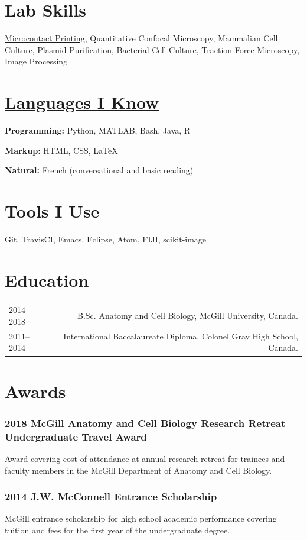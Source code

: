 \documentclass[%
	12pt,%
	]
	{article}
\begin{document}
\section*{Lab Skills}

\href{https://jidicula.github.io/images/micropattern.jpg}{Microcontact Printing}, Quantitative Confocal Microscopy, Mammalian Cell Culture, Plasmid Purification, Bacterial Cell Culture, Traction Force Microscopy, Image Processing


\section*{\href{https://github.com/jidicula}{Languages I Know}}

\textbf{Programming:} Python, MATLAB, Bash, Java, R

\textbf{Markup:} HTML, CSS, LaTeX

\textbf{Natural:} French (conversational and basic reading)

\section*{Tools I Use}

Git, TravisCI, Emacs, Eclipse, Atom, FIJI, scikit-image

\section*{Education}
\begin{tabular}{LR}
2014--2018&B.Sc. Anatomy and Cell Biology, McGill University, Canada.\\[5pt]
2011--2014&International Baccalaureate Diploma, Colonel Gray High School, Canada.\\
\end{tabular}

\section*{Awards}
\subsubsection*{2018 McGill Anatomy and Cell Biology Research Retreat Undergraduate Travel Award}
Award covering cost of attendance at annual research retreat for trainees and faculty members in the McGill Department of Anatomy and Cell Biology.

\subsubsection*{2014 J.W. McConnell Entrance Scholarship}
McGill entrance scholarship for high school academic performance covering tuition and fees for the first year of the undergraduate degree.
\end{document}
